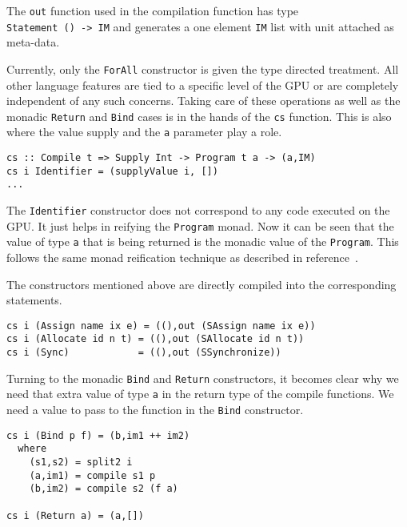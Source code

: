 The {\tt out} function used in the compilation function has type \\ {\tt Statement () -> IM}
and generates a one element {\tt IM} list with unit attached as meta-data. 

Currently, only the {\tt ForAll} constructor is given the type directed treatment. 
All other language features are tied to a specific level of the GPU or are
completely independent of any such concerns. Taking care of these operations 
as well as the monadic {\tt Return} and {\tt Bind} cases is in the hands of the 
{\tt cs} function. This is also where the value supply and the {\tt a} parameter 
play a role. 

\begin{small}
\begin{verbatim} 
cs :: Compile t => Supply Int -> Program t a -> (a,IM) 
cs i Identifier = (supplyValue i, [])
... 
\end{verbatim}
\end{small}

The {\tt Identifier} constructor does not correspond to any code executed on the GPU. 
It just helps in reifying the {\tt Program} monad. Now it can 
be seen that the value of type {\tt a} that is being returned is the monadic value of 
the {\tt Program}. This follows the same monad reification technique as described 
in reference~\cite{BB}.  


The constructors mentioned above are directly compiled into the corresponding 
statements. 

\begin{small}
\begin{verbatim} 
cs i (Assign name ix e) = ((),out (SAssign name ix e))
cs i (Allocate id n t) = ((),out (SAllocate id n t))
cs i (Sync)            = ((),out (SSynchronize))
\end{verbatim}
\end{small}

Turning to the monadic {\tt Bind} and {\tt Return} constructors, 
it becomes clear why we need that extra value of type {\tt a} in the return 
type of the compile functions.
We need a value to pass to the function in 
the {\tt Bind} constructor. 

\begin{small}
\begin{verbatim} 
cs i (Bind p f) = (b,im1 ++ im2) 
  where
    (s1,s2) = split2 i
    (a,im1) = compile s1 p
    (b,im2) = compile s2 (f a)

cs i (Return a) = (a,[])
\end{verbatim}
\end{small}


